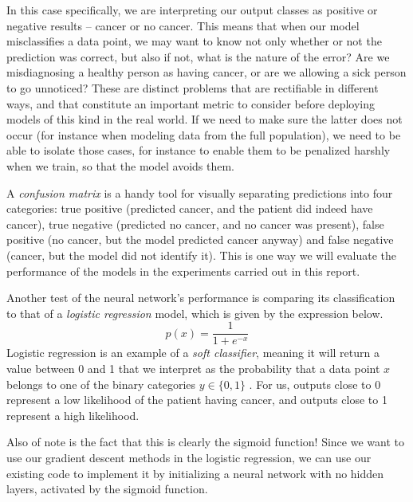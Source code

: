 In this case specifically, we are interpreting our output classes as positive or negative results -- cancer or no cancer. This means that when our model misclassifies a data point, we may want to know not only whether or not the prediction was correct, but also if not, what is the nature of the error? Are we misdiagnosing a healthy person as having cancer, or are we allowing a sick person to go unnoticed? These are distinct problems that are rectifiable in different ways, and that constitute an important metric to consider before deploying models of this kind in the real world. If we need to make sure the latter does not occur (for instance when modeling data from the full population), we need to be able to isolate those cases, for instance to enable them to be penalized harshly when we train, so that the model avoids them. 

A \emph{confusion matrix} is a handy tool for visually separating predictions into four categories: true positive (predicted cancer, and the patient did indeed have cancer), true negative (predicted no cancer, and no cancer was present), false positive (no cancer, but the model predicted cancer anyway) and false negative (cancer, but the model did not identify it). This is one way we will evaluate the performance of the models in the experiments carried out in this report.

Another test of the neural network's performance is comparing its classification to that of a \emph{logistic regression} model, which is given by the expression below.
\[p(x) = \frac{1}{1 + e^{-x}}\]
Logistic regression is an example of a \emph{soft classifier}, meaning it will return a value between 0 and 1 that we interpret as the probability that a data point $x$ belongs to one of the binary categories $y \in \{0,1\}$ \cite{MHJlogisticregression}. For us, outputs close to 0 represent a low likelihood of the patient having cancer, and outputs close to 1 represent a high likelihood.

Also of note is the fact that this is clearly the sigmoid function! Since we want to use our gradient descent methods in the logistic regression, we can use our existing code to implement it by initializing a neural network with no hidden layers, activated by the sigmoid function. %

